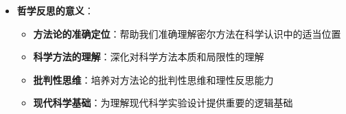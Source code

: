 \begin{center}
{{\begin{itemize}
\begin{itemize}
  \end{itemize}
\item \textbf{哲学反思的意义}：
  \begin{itemize}
  \item \textbf{方法论的准确定位}：帮助我们准确理解密尔方法在科学认识中的适当位置
  \item \textbf{科学方法的理解}：深化对科学方法本质和局限性的理解
  \item \textbf{批判性思维}：培养对方法论的批判性思维和理性反思能力
  \item \textbf{现代科学基础}：为理解现代科学实验设计提供重要的逻辑基础
  \end{itemize}
\end{itemize}
}}
\end{center}
